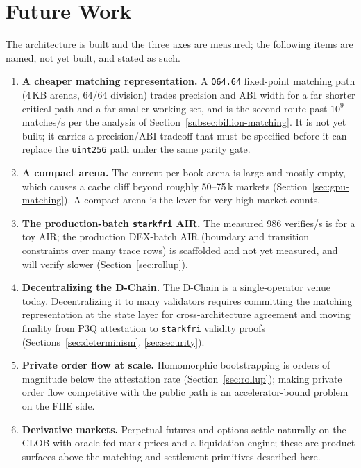 \section{Future Work}
\label{sec:future}

The architecture is built and the three axes are measured; the following items are named,
not yet built, and stated as such.

\begin{enumerate}
  \item \textbf{A cheaper matching representation.} A \texttt{Q64.64} fixed-point matching
  path (4\,KB arenas, $64/64$ division) trades precision and ABI width for a far shorter
  critical path and a far smaller working set, and is the second route past $10^{9}$
  matches/s per the analysis of Section~\ref{subsec:billion-matching}. It is not yet built; it
  carries a precision/ABI tradeoff that must be specified before it can replace the
  \texttt{uint256} path under the same parity gate.
  \item \textbf{A compact arena.} The current per-book arena is large and mostly empty, which
  causes a cache cliff beyond roughly 50--75\,k markets (Section~\ref{sec:gpu-matching}). A
  compact arena is the lever for very high market counts.
  \item \textbf{The production-batch \texttt{starkfri} AIR.} The measured 986 verifies/s is
  for a toy AIR; the production DEX-batch AIR (boundary and transition constraints over many
  trace rows) is scaffolded and not yet measured, and will verify slower
  (Section~\ref{sec:rollup}).
  \item \textbf{Decentralizing the D-Chain.} The D-Chain is a single-operator venue today.
  Decentralizing it to many validators requires committing the matching representation at the
  state layer for cross-architecture agreement and moving finality from P3Q attestation to
  \texttt{starkfri} validity proofs (Sections~\ref{sec:determinism}, \ref{sec:security}).
  \item \textbf{Private order flow at scale.} Homomorphic bootstrapping is orders of magnitude
  below the attestation rate (Section~\ref{sec:rollup}); making private order flow
  competitive with the public path is an accelerator-bound problem on the FHE side.
  \item \textbf{Derivative markets.} Perpetual futures and options settle naturally on the
  CLOB with oracle-fed mark prices and a liquidation engine; these are product surfaces above
  the matching and settlement primitives described here.
\end{enumerate}

